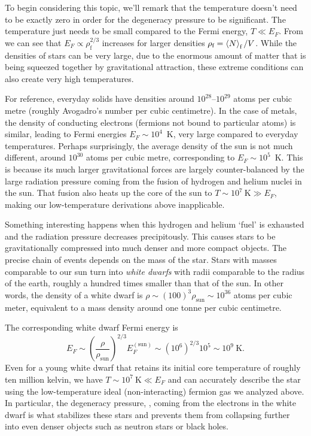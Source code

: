 To begin considering this topic, we'll remark that the temperature doesn't need to be exactly zero in order for the degeneracy pressure to be significant.
The temperature just needs to be small compared to the Fermi energy, $T \ll E_F$.
From  we can see that $E_F \propto \rho_{\text{f}}^{2 / 3}$ increases for larger densities $\rho_{\text{f}} = \left\langle N \right\rangle_{\text{f}} / V$.
While the densities of stars can be very large, due to the enormous amount of matter that is being squeezed together by gravitational attraction, these extreme conditions can also create very high temperatures.

For reference, everyday solids have densities around $10^{28}$--$10^{29}$ atoms per cubic metre (roughly Avogadro's number per cubic centimetre).
In the case of metals, the density of conducting electrons (fermions not bound to particular atoms) is similar, leading to Fermi energies $E_F \sim 10^4$~K, very large compared to everyday temperatures. %
Perhaps surprisingly, the average density of the sun is not much different, around $10^{30}$ atoms per cubic metre, corresponding to $E_F \sim 10^5$~K.
This is because its much larger gravitational forces are largely counter-balanced by the large radiation pressure coming from the fusion of hydrogen and helium nuclei in the sun.
That fusion also heats up the core of the sun to $T \sim 10^7~\mbox{K} \gg E_F$, making our low-temperature derivations above inapplicable.

Something interesting happens when this hydrogen and helium `fuel' is exhausted and the radiation pressure decreases precipitously.
This causes stars to be gravitationally compressed into much denser and more compact objects.
The precise chain of events depends on the mass of the star.
Stars with masses comparable to our sun turn into \textit{white dwarfs} with radii comparable to the radius of the earth, roughly a hundred times smaller than that of the sun.
In other words, the density of a white dwarf is $\rho \sim (100)^3 \rho_{\text{sun}} \sim 10^{36}$ atoms per cubic meter, equivalent to a mass density around one tonne per cubic centimetre. %

The corresponding white dwarf Fermi energy is
\begin{equation*}
  E_F \sim \left(\frac{\rho}{\rho_{\text{sun}}}\right)^{2 / 3} E_F^{(\text{sun})} \sim \left(10^6\right)^{2 / 3} 10^5 \sim 10^9~\mbox{K}.
\end{equation*}
Even for a young white dwarf that retains its initial core temperature of roughly ten million kelvin, we have $T \sim 10^7~\mbox{K} \ll E_F$ and can accurately describe the star using the low-temperature ideal (non-interacting) fermion gas we analyzed above. %
In particular, the degeneracy pressure, , coming from the electrons in the white dwarf is what stabilizes these stars and prevents them from collapsing further into even denser objects such as neutron stars or black holes.

